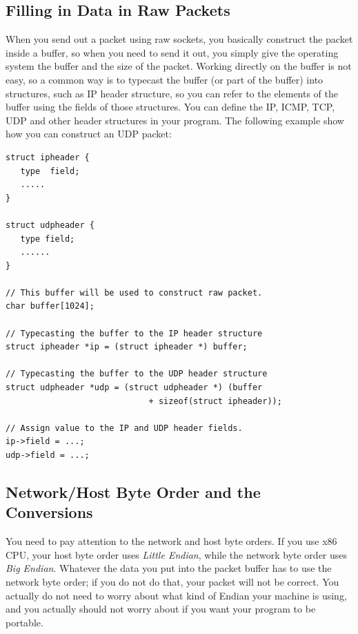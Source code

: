 \subsection{Filling in Data in Raw Packets}


When you send out a packet using raw sockets, you basically construct 
the packet inside a buffer, so when you need to send it out, you simply
give the operating system the buffer and the size of the packet. 
Working directly on the buffer is not easy, so a common way is to
typecast the buffer (or part of the buffer) into 
structures, such as IP header structure, so you can refer to the elements
of the buffer using the fields of those structures. 
You can define the IP, ICMP, TCP, UDP and other header structures in your 
program. The following example show how you can construct an UDP packet:

 
\begin{lstlisting}
struct ipheader {
   type  field;
   .....
}

struct udpheader {
   type field;
   ......
}

// This buffer will be used to construct raw packet.
char buffer[1024];

// Typecasting the buffer to the IP header structure
struct ipheader *ip = (struct ipheader *) buffer;

// Typecasting the buffer to the UDP header structure
struct udpheader *udp = (struct udpheader *) (buffer
                             + sizeof(struct ipheader));

// Assign value to the IP and UDP header fields.
ip->field = ...;
udp->field = ...;
\end{lstlisting}



\subsection{Network/Host Byte Order and the Conversions}


You need to pay attention to the network and host byte orders. If you use 
x86 CPU, your host byte order uses {\em Little Endian}, while 
the network byte order uses {\em Big Endian}. Whatever the data you put 
into the packet buffer has to use the network byte order; if you do not 
do that, your packet will not be correct. You actually do not need to worry
about what kind of Endian your machine is using, and you actually should not worry
about if you want your program to be portable. 


